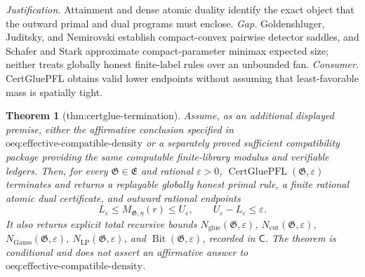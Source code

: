 \documentclass{article}
\newtheorem{theorem}{Theorem}
\begin{document}
\par\smallskip\noindent \textit{Justification.} Attainment and dense atomic duality identify the exact object that the outward primal and dual programs must enclose. \textit{Gap.} Goldenshluger, Juditsky, and Nemirovski establish compact-convex pairwise detector saddles, and Schafer and Stark approximate compact-parameter minimax expected size; neither treats globally honest finite-label rules over an unbounded fan. \textit{Consumer.} CertGluePFL obtains valid lower endpoints without assuming that least-favorable mass is spatially tight.

\begin{theorem}[thm:certglue-termination]\label{thm:certglue-termination}
Assume, as an additional displayed premise, either the affirmative conclusion specified in \(\text{oeq:effective-compatible-density}\) or a separately proved sufficient compatibility package providing the same computable finite-library modulus and verifiable ledgers.  Then, for every \(\mathfrak G\in\mathfrak E\) and rational \(\varepsilon>0\), \(\operatorname{CertGluePFL}(\mathfrak G,\varepsilon)\) terminates and returns a replayable globally honest primal rule, a finite rational atomic dual certificate, and outward rational endpoints
\[
L_{\varepsilon}\le M_{\mathfrak G,\eta}(r)\le U_{\varepsilon},
\qquad U_{\varepsilon}-L_{\varepsilon}\le\varepsilon.
\]
It also returns explicit total recursive bounds \(N_{\mathrm{glue}}(\mathfrak G,\varepsilon)\), \(N_{\mathrm{cut}}(\mathfrak G,\varepsilon)\), \(N_{\mathrm{Gauss}}(\mathfrak G,\varepsilon)\), \(N_{\mathrm{LP}}(\mathfrak G,\varepsilon)\), and \(\operatorname{Bit}(\mathfrak G,\varepsilon)\), recorded in \(\mathsf C\).  The theorem is conditional and does not assert an affirmative answer to \(\text{oeq:effective-compatible-density}\).
\end{theorem}
\end{document}
